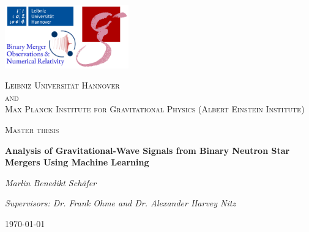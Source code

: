 \documentclass[11pt,a4paper]{article}
\numberwithin{equation}{section}
\theoremstyle{mystyle}
\numberwithin{thm}{subsection}
\begin{document}
\begin{titlepage}
\raggedbottom
\raggedright
\includegraphics[width=0.4\textwidth]{Logo.png}\par
\vspace{0.7cm}
\centering
{\scshape\LARGE Leibniz Universität Hannover\\and\\Max Planck Institute for Gravitational Physics (Albert Einstein Institute)\par}
\vspace{1cm}
{\scshape\Large Master thesis\par}
\vspace{1.2cm}
{\bfseries\huge Analysis of Gravitational-Wave Signals from Binary Neutron Star Mergers Using Machine Learning\par}
\vspace{2cm}
{\itshape\Large Marlin Benedikt Schäfer\par}
\vfill
{\itshape Supervisors: Dr. Frank Ohme and Dr. Alexander Harvey Nitz\par}
\vfill
{\large\today\par}
\vfill
\end{titlepage}
\thispagestyle{empty}
\newpage

\setcounter{page}{2}
$\ $
\thispagestyle{empty}
\newpage
\end{document}
